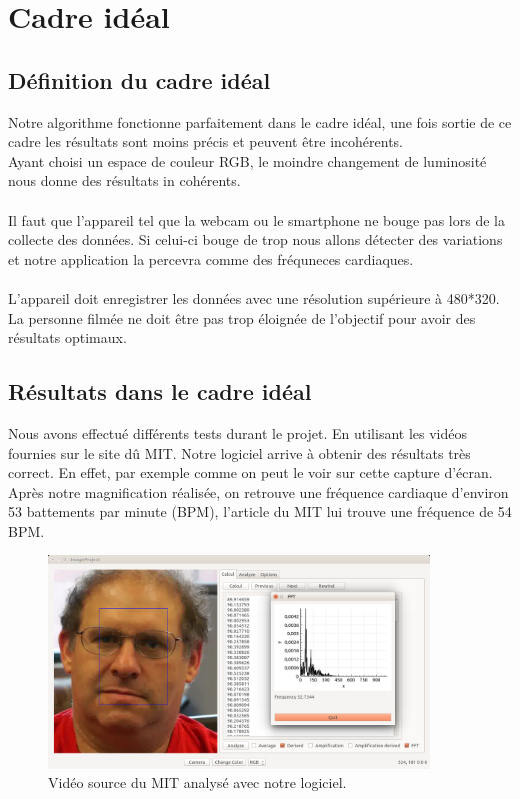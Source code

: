 \section{Cadre idéal}

\subsection{Définition du cadre idéal}
Notre algorithme fonctionne parfaitement dans le cadre idéal, une fois sortie de ce cadre les résultats sont moins précis et peuvent être incohérents. \\Ayant choisi un espace de couleur RGB, le moindre changement de luminosité nous donne des résultats in cohérents. \\\\
Il faut que l'appareil tel que la webcam ou le smartphone ne bouge pas lors de la collecte des données. Si celui-ci bouge de trop nous allons détecter des variations et notre application la percevra comme des fréquneces cardiaques.\\\\
L'appareil doit enregistrer les données avec une résolution supérieure à 480*320.\\
La personne filmée ne doit être pas trop éloignée de l'objectif pour avoir des résultats optimaux.

\subsection{Résultats dans le cadre idéal}
Nous avons effectué différents tests durant le projet. En utilisant les vidéos fournies sur le site dû MIT\@. Notre logiciel arrive à obtenir des 
résultats très correct. En effet, par exemple comme on peut le voir sur cette capture d'écran. Après notre magnification réalisée, on retrouve
une fréquence cardiaque d'environ 53 battements par minute (BPM), l'article du MIT lui trouve une fréquence de 54 BPM\@. 

\begin{figure}[h!]
	\centering
	\includegraphics[width=0.9\textwidth]{data/cas-ideal.png}
	\caption{Vidéo source du MIT analysé avec notre logiciel.}
\end{figure}

